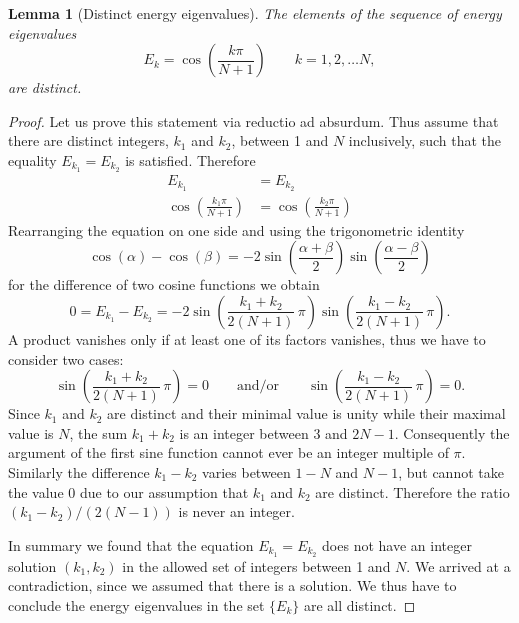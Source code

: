 \documentclass[a4paper, 10pt, draft]{article}
\theoremstyle{plain}
\newtheorem{lemma}[]{Lemma}
\begin{document}
\begin{lemma}[Distinct energy eigenvalues]
    The elements of the sequence of energy eigenvalues
    \begin{equation*}
        E_{k} = \cos{\!\left ( \frac{k \pi}{N+1} \right )}
        \qquad k=1, 2, \dots N,
    \end{equation*}
    are distinct.
\end{lemma}
\begin{proof}
    Let us prove this statement via reductio ad absurdum. Thus assume that there
    are distinct integers, $k_{1}$ and $k_{2}$, between 1 and $N$ inclusively,
    such that the equality $E_{k_{1}} = E_{k_{2}}$ is satisfied. Therefore
    \begin{align*}
        E_{k_{1}}
        &=
        E_{k_{2}}
        \\
        \cos{\!\left ( \frac{k_{1} \pi}{N+1} \right )}
        &=
        \cos{\!\left ( \frac{k_{2} \pi}{N+1} \right )}
    \end{align*}
    Rearranging the equation on one side and using the trigonometric identity
    \begin{equation*}
        \cos{\!(\alpha)} - \cos{\!(\beta)}
        =
        -2 \sin{\!\left ( \frac{\alpha+\beta}{2} \right )}
        \sin{\!\left ( \frac{\alpha - \beta}{2} \right )}
    \end{equation*}
    for the difference of two cosine functions we obtain
    \begin{equation*}
        0
        =
        E_{k_{1}} - E_{k_{2}}
        =
        -2
        \sin{\!\left ( \frac{k_{1} + k_{2}}{2(N+1)} \,\pi\right )}
        \sin{\!\left ( \frac{k_{1} - k_{2}}{2(N+1)} \,\pi\right )}.
    \end{equation*}
    A product vanishes only if at least one of its factors vanishes, thus we
    have to consider two cases:
    \begin{equation*}
        \sin{\!\left ( \frac{k_{1} + k_{2}}{2(N+1)} \,\pi\right )} = 0
        \qquad \text{and/or} \qquad
        \sin{\!\left ( \frac{k_{1} - k_{2}}{2(N+1)} \,\pi\right )} = 0.
    \end{equation*}
    Since $k_{1}$ and $k_{2}$ are distinct and their minimal value is unity
    while their maximal value is $N$, the sum $k_{1}+k_{2}$ is an integer
    between $3$ and $2N-1$. Consequently the argument of the first sine function
    cannot ever be an integer multiple of $\pi$. Similarly the difference $k_{1}
    - k_{2}$ varies between $1-N$ and $N-1$, but cannot take the value $0$ due
    to our assumption that $k_{1}$ and $k_{2}$ are distinct. Therefore the ratio
    $(k_{1}-k_{2})/(2(N-1))$ is never an integer.

    In summary we found that the equation $E_{k_{1}} = E_{k_{2}}$ does not
    have an integer solution $(k_{1}, k_{2})$ in the allowed set of integers
    between 1 and $N$. We arrived at a contradiction, since we assumed that
    there is a solution. We thus have to conclude the energy eigenvalues in the
    set $\lbrace E_{k} \rbrace$ are all distinct.
\end{proof}
\end{document}
